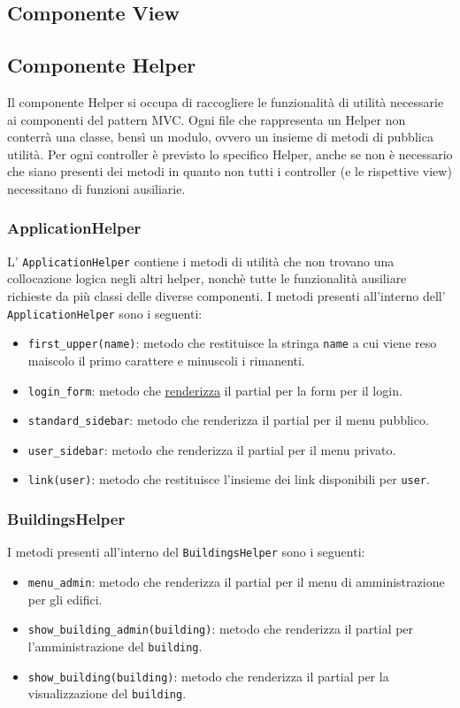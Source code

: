 \documentclass[11pt,a4paper]{article}
\begin{document}
\subsection{Componente View}
\subsection{Componente Helper}\label{helper}
Il componente Helper si occupa di raccogliere le funzionalità di utilità necessarie ai componenti del pattern MVC. Ogni file che rappresenta un Helper non conterrà una classe, bensì un modulo, ovvero un insieme di metodi di pubblica utilità. Per ogni controller è previsto lo specifico Helper, anche se non è necessario che siano presenti dei metodi in quanto non tutti i controller (e le rispettive view) necessitano di funzioni ausiliarie.
\subsubsection{ApplicationHelper}
L' \verb|ApplicationHelper| contiene i metodi di utilità che non trovano una collocazione logica negli altri helper, nonchè tutte le funzionalità ausiliare richieste da più classi delle diverse componenti.
I metodi presenti all'interno dell' \verb|ApplicationHelper| sono i seguenti:
\begin{itemize}
 \item \verb|first_upper(name)|: metodo che restituisce la stringa \verb|name| a cui viene reso maiscolo il primo carattere e minuscoli i rimanenti.
 \item \verb|login_form|: metodo che \underline{renderizza} il partial per la form per il login.
 \item \verb|standard_sidebar|: metodo che renderizza il partial per il menu pubblico.
 \item \verb|user_sidebar|: metodo che renderizza il partial per il menu privato.
 \item \verb|link(user)|: metodo che restituisce l'insieme dei link disponibili per \verb|user|.
\end{itemize}
\subsubsection{BuildingsHelper}
I metodi presenti all'interno del \verb|BuildingsHelper| sono i seguenti:
\begin{itemize}
 \item \verb|menu_admin|: metodo che renderizza il partial per il menu di amministrazione per gli edifici.
 \item \verb|show_building_admin(building)|: metodo che renderizza il partial per l'amministrazione del \verb|building|.
 \item \verb|show_building(building)|: metodo che renderizza il partial per la visualizzazione del \verb|building|.
\end{itemize}
\end{document}
